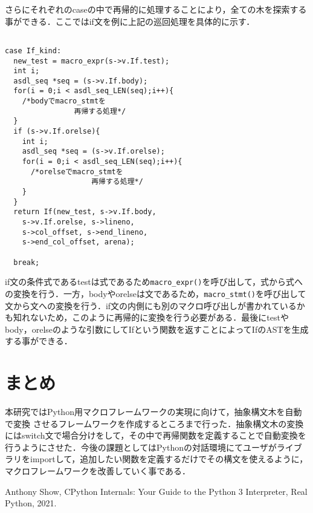 \documentclass[twocolumn]{jsarticle}
\begin{document}
さらにそれぞれのcaseの中で再帰的に処理することにより，全ての木を探索する事ができる．ここではif文を例に上記の巡回処理を具体的に示す．

\setlength{\baselineskip}{12pt}
\begin{verbatim}

case If_kind:
  new_test = macro_expr(s->v.If.test);
  int i; 
  asdl_seq *seq = (s->v.If.body); 
  for(i = 0;i < asdl_seq_LEN(seq);i++){
    /*bodyでmacro_stmtを
                再帰する処理*/
  } 
  if (s->v.If.orelse){ 
    int i; 
    asdl_seq *seq = (s->v.If.orelse); 
    for(i = 0;i < asdl_seq_LEN(seq);i++){
      /*orelseでmacro_stmtを
                    再帰する処理*/
    } 
  }
  return If(new_test, s->v.If.body, 
    s->v.If.orelse, s->lineno, 
    s->col_offset, s->end_lineno, 
    s->end_col_offset, arena);

  break;
\end{verbatim}

if文の条件式であるtestは式であるため\verb|macro_expr()|を呼び出して，式から式への変換を行う．一方，bodyやorelseは文であるため，\verb|macro_stmt()|を呼び出して文から文への変換を行う．if文の内側にも別のマクロ呼び出しが書かれているかも知れないため，このように再帰的に変換を行う必要がある．最後にtestやbody，orelseのような引数にしてIfという関数を返すことによってIfのASTを生成する事ができる．

\section{まとめ}
本研究ではPython用マクロフレームワークの実現に向けて，抽象構文木を自動で変換
させるフレームワークを作成するところまで行った．抽象構文木の変換にはswitch文で場合分けをして，その中で再帰関数を定義することで自動変換を行うようにさせた．今後の課題としてはPythonの対話環境にてユーザがライブラリをimportして，追加したい関数を定義するだけでその構文を使えるように，マクロフレームワークを改善していく事である．
\begin{thebibliography}{99}

 Anthony Show, CPython Internals:
Your Guide to the Python 3 Interpreter, Real Python, 2021.

\end{thebibliography}
\end{document}
